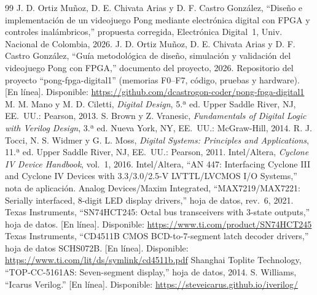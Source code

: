 \documentclass[conference,a4paper]{IEEEtran}
\begin{document}
\begin{thebibliography}{99}
 J. D. Ortiz Muñoz, D. E. Chivata Arias y D. F. Castro González, ``Diseño e implementación de un videojuego Pong mediante electrónica digital con FPGA y controles inalámbricos,'' propuesta corregida, Electrónica Digital~1, Univ. Nacional de Colombia, 2026.
 J. D. Ortiz Muñoz, D. E. Chivata Arias y D. F. Castro González, ``Guía metodológica de diseño, simulación y validación del videojuego Pong con FPGA,'' documento del proyecto, 2026.
 Repositorio del proyecto ``pong-fpga-digital1'' (memorias F0--F7, código, pruebas y hardware). [En línea]. Disponible: \url{https://github.com/dcastrogon-coder/pong-fpga-digital1}
 M. M. Mano y M. D. Ciletti, \textit{Digital Design}, 5.ª ed. Upper Saddle River, NJ, EE.~UU.: Pearson, 2013.
 S. Brown y Z. Vranesic, \textit{Fundamentals of Digital Logic with Verilog Design}, 3.ª ed. Nueva York, NY, EE.~UU.: McGraw-Hill, 2014.
 R. J. Tocci, N. S. Widmer y G. L. Moss, \textit{Digital Systems: Principles and Applications}, 11.ª ed. Upper Saddle River, NJ, EE.~UU.: Pearson, 2011.
 Intel/Altera, \textit{Cyclone IV Device Handbook}, vol.~1, 2016.
 Intel/Altera, ``AN 447: Interfacing Cyclone III and Cyclone IV Devices with 3.3/3.0/2.5-V LVTTL/LVCMOS I/O Systems,'' nota de aplicación.
 Analog Devices/Maxim Integrated, ``MAX7219/MAX7221: Serially interfaced, 8-digit LED display drivers,'' hoja de datos, rev.~6, 2021.
 Texas Instruments, ``SN74HCT245: Octal bus transceivers with 3-state outputs,'' hoja de datos. [En línea]. Disponible: \url{https://www.ti.com/product/SN74HCT245}
 Texas Instruments, ``CD4511B CMOS BCD-to-7-segment latch decoder drivers,'' hoja de datos SCHS072B. [En línea]. Disponible: \url{https://www.ti.com/lit/ds/symlink/cd4511b.pdf}
 Shanghai Toplite Technology, ``TOP-CC-5161AS: Seven-segment display,'' hoja de datos, 2014.
 S. Williams, ``Icarus Verilog.'' [En línea]. Disponible: \url{https://steveicarus.github.io/iverilog/}
\end{thebibliography}
\end{document}
